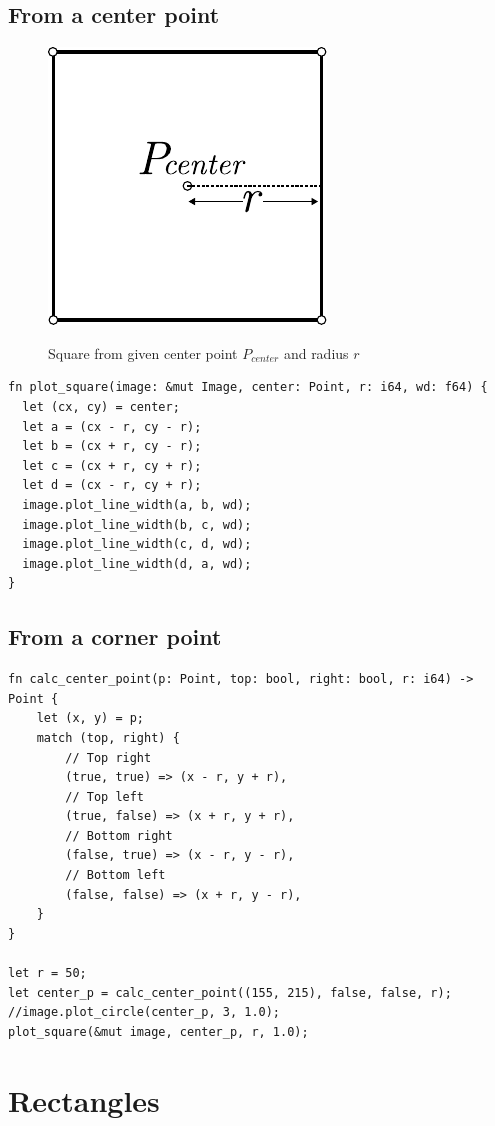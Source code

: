 \documentclass[12pt,openany,a4,usenames,dvipsnames]{book}
\DeclareRobustCommand{\Caption}[1]{\par%
  \vspace{1em}
  {\noindent{}#1}}
\begin{document}
\subsection{From a center point}
\begin{figure}[H]
\centering
\includegraphics[scale=1,keepaspectratio]{figures/square_from_center_point.pdf}
\Caption{Square from given center point $P_{center}$ and radius $r$}
\end{figure}
\begin{verbatim}
fn plot_square(image: &mut Image, center: Point, r: i64, wd: f64) {
  let (cx, cy) = center;
  let a = (cx - r, cy - r);
  let b = (cx + r, cy - r);
  let c = (cx + r, cy + r);
  let d = (cx - r, cy + r);
  image.plot_line_width(a, b, wd);
  image.plot_line_width(b, c, wd);
  image.plot_line_width(c, d, wd);
  image.plot_line_width(d, a, wd);
}
\end{verbatim}
\subsection{From a corner point}
\begin{verbatim}
fn calc_center_point(p: Point, top: bool, right: bool, r: i64) -> Point {
    let (x, y) = p;
    match (top, right) {
        // Top right
        (true, true) => (x - r, y + r),
        // Top left
        (true, false) => (x + r, y + r),
        // Bottom right
        (false, true) => (x - r, y - r),
        // Bottom left
        (false, false) => (x + r, y - r),
    }
}

let r = 50;
let center_p = calc_center_point((155, 215), false, false, r);
//image.plot_circle(center_p, 3, 1.0);
plot_square(&mut image, center_p, r, 1.0);
\end{verbatim}
\section{Rectangles}
\skelpar%
\end{document}

